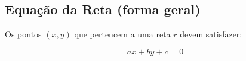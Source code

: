 \subsection{Equação da Reta (forma geral)}

Os pontos $(x,y)$ que pertencem a uma reta $r$ devem satisfazer:

\[
ax + by + c = 0
\]
